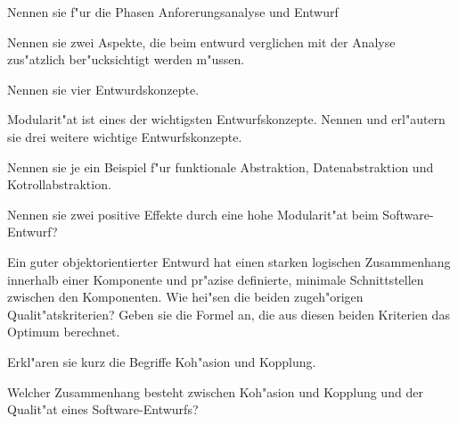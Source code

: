\documentclass[12pt]{exam}
\begin{document}
\begin{questions}
\question[5] Nennen sie f"ur die Phasen Anforerungsanalyse und Entwurf
\noaddpoints
{}
\addpoints

\question[2] Nennen sie zwei Aspekte, die beim entwurd verglichen mit der Analyse zus"atzlich ber"ucksichtigt werden m"ussen.
\addpoints

\question[4] Nennen sie vier Entwurdskonzepte.
\addpoints

\question[6] Modularit"at ist eines der wichtigsten Entwurfskonzepte. Nennen und erl"autern sie drei weitere wichtige Entwurfskonzepte.
\addpoints

\question[3] Nennen sie je ein Beispiel f"ur funktionale Abstraktion, Datenabstraktion und Kotrollabstraktion.
\addpoints

\question[2] Nennen sie zwei positive Effekte durch eine hohe Modularit"at beim Software-Entwurf?
\addpoints

\question[4] Ein guter objektorientierter Entwurd hat einen starken logischen Zusammenhang innerhalb einer Komponente und pr"azise definierte, minimale Schnittstellen zwischen den Komponenten. Wie hei"sen die beiden zugeh"origen Qualit"atskriterien? Geben sie die Formel an, die aus diesen beiden Kriterien das Optimum berechnet.
\addpoints

\question[2] Erkl"aren sie kurz die Begriffe Koh"asion und Kopplung.
\addpoints

\question[4] Welcher Zusammenhang besteht zwischen Koh"asion und Kopplung und der Qualit"at eines Software-Entwurfs?
\addpoints


\end{questions}
\end{document}
